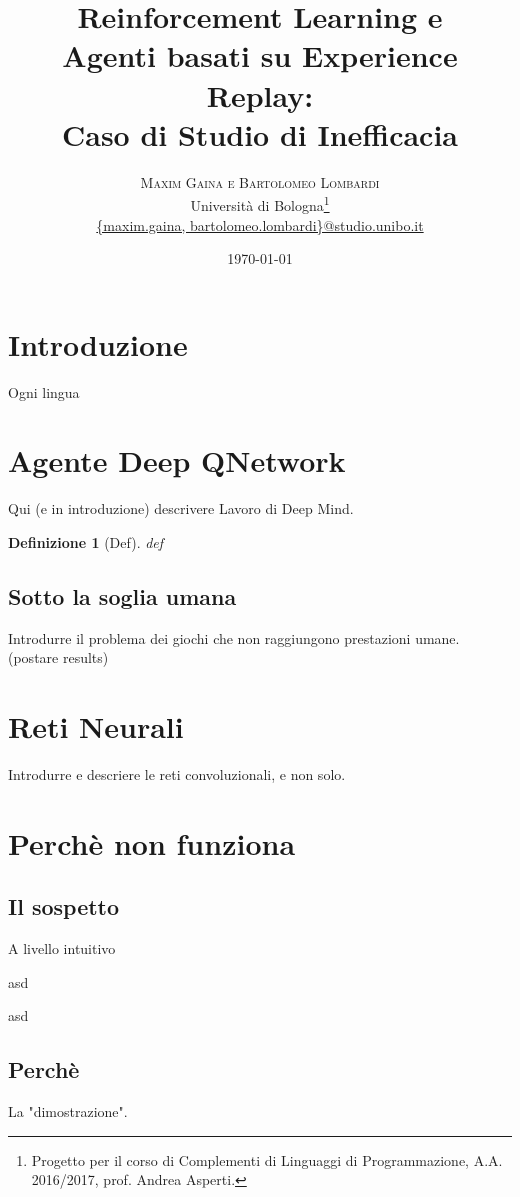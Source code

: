 \documentclass[twoside,twocolumn,10pt]{extarticle}
\title{Reinforcement Learning e\\ Agenti basati su Experience Replay:\\ Caso di Studio di Inefficacia} %
\author{%
\textsc{Maxim Gaina e Bartolomeo Lombardi} \\[1ex] %
\normalsize Università di Bologna\thanks{Progetto per il corso di Complementi di Linguaggi di Programmazione, A.A. 2016/2017, prof. Andrea Asperti.} \\ %
\normalsize \href{mailto:maxim.gaina@studio.unibo.it}{\{maxim.gaina, bartolomeo.lombardi\}@studio.unibo.it}
}
\date{\today} %
\theoremstyle{definition}
\begin{document}
\maketitle

\tableofcontents

\section*{Introduzione}
	\lettrine[nindent = 0.4em,lines=3]{O}\space\MakeTextLowercase{g}ni lingua 
	
\section{Agente Deep Q\texttwelveudash Network}\label{sec:dqn-agent}
	Qui (e in introduzione) descrivere Lavoro di Deep Mind.
	\theoremstyle{plain}
	\newtheorem{definition}{Definizione}
	\begin{definition}[Def]\label{def:}
		def
	\end{definition}

	\subsection{Sotto la soglia umana}
		Introdurre il problema dei giochi che non raggiungono prestazioni umane. (postare results)

\section{Reti Neurali}\label{}
	Introdurre e descriere le reti convoluzionali, e non solo.
	
\section{Perchè non funziona}\label{}
	\subsection{Il sospetto}
		A livello intuitivo
		\begin{table*}[h]
			\centering
			\caption{asd}
			
			\label{tab:gerarchia}
		\end{table*}
		\begin{table*}[h]
			\centering
			\caption{asd}
			\label{tab:pgm}
			
		\end{table*}
	
	
	\subsection{Perchè}
		La "dimostrazione".
		
\end{document}
